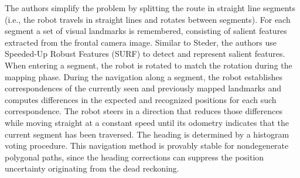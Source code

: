 The authors simplify the problem by splitting the route in straight line segments (i.e., the robot travels in straight lines and rotates between segments).
For each segment a set of visual landmarks is remembered, consisting of salient features extracted from the frontal camera image.
Similar to Steder, the authors use Speeded-Up Robust Features (SURF) to detect and represent salient features.
When entering a segment, the robot is rotated to match the rotation during the mapping phase.
During the navigation along a segment, the robot establishes correspondences of the currently seen and previously mapped landmarks and computes differences in the expected and recognized positions for each such correspondence.
The robot steers in a direction that reduces those differences while moving straight at a constant speed until its odometry indicates that the current segment has been traversed.
The heading is determined by a histogram voting procedure.
This navigation method is provably stable for nondegenerate polygonal paths, since the heading corrections can suppress the position uncertainty originating from the dead reckoning.
